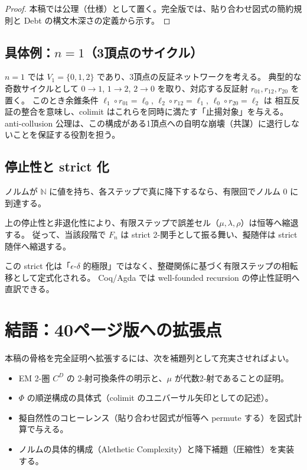 \documentclass[a4paper,11pt]{article}
\begin{document}
\begin{proof}
本稿では公理（仕様）として置く。完全版では、貼り合わせ図式の簡約規則と Debt の構文木深さの定義から示す。
\end{proof}

\subsection{具体例：\texorpdfstring{$n=1$}{n=1}（3頂点のサイクル）}
\begin{remark}
$n=1$ では $V_1=\{0,1,2\}$ であり、3頂点の反証ネットワークを考える。
典型的な奇数サイクルとして $0\to 1$, $1\to 2$, $2\to 0$ を取り、対応する反証射 $r_{01},r_{12},r_{20}$ を置く。
このとき余錐条件 $\ell_1\circ r_{01}=\ell_0$, $\ell_2\circ r_{12}=\ell_1$, $\ell_0\circ r_{20}=\ell_2$ は
相互反証の整合を意味し、colimit はこれらを同時に満たす「止揚対象」を与える。
anti-collusion 公理は、この構成がある1頂点への自明な崩壊（共謀）に退行しないことを保証する役割を担う。
\end{remark}

\subsection{停止性と strict 化}
\begin{theorem}[整礎降下による停止性]
ノルムが $\mathbb{N}$ に値を持ち、各ステップで真に降下するなら、有限回でノルム 0 に到達する。
\end{theorem}

\begin{theorem}
上の停止性と非退化性により、有限ステップで誤差セル（$\mu,\lambda,\rho$）は恒等へ縮退する。
従って、当該段階で $F_n$ は strict 2-関手として振る舞い、擬随伴は strict 随伴へ縮退する。
\end{theorem}

\begin{remark}
この strict 化は「$\epsilon$-$\delta$ 的極限」ではなく、整礎関係に基づく有限ステップの相転移として定式化される。
Coq/Agda では well-founded recursion の停止性証明へ直訳できる。
\end{remark}

\section{結語：40ページ版への拡張点}
本稿の骨格を完全証明へ拡張するには、次を補題列として充実させればよい。
\begin{itemize}
  \item EM 2-圏 $C^D$ の 2-射可換条件の明示と、$\mu$ が代数2-射であることの証明。
  \item $\Phi$ の順逆構成の具体式（colimit のユニバーサル矢印としての記述）。
  \item 擬自然性のコヒーレンス（貼り合わせ図式が恒等へ permute する）を図式計算で与える。
  \item ノルムの具体的構成（Alethetic Complexity）と降下補題（圧縮性）を実装する。
\end{itemize}
\end{document}
